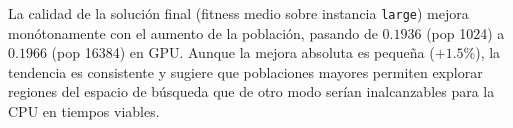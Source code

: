 La calidad de la solución final (fitness medio sobre instancia \texttt{large}) mejora monótonamente con el aumento de la población, pasando de $0.1936$ (pop 1024) a $0.1966$ (pop 16384) en GPU. Aunque la mejora absoluta es pequeña ($+1.5\%$), la tendencia es consistente y sugiere que poblaciones mayores permiten explorar regiones del espacio de búsqueda que de otro modo serían inalcanzables para la CPU en tiempos viables.
